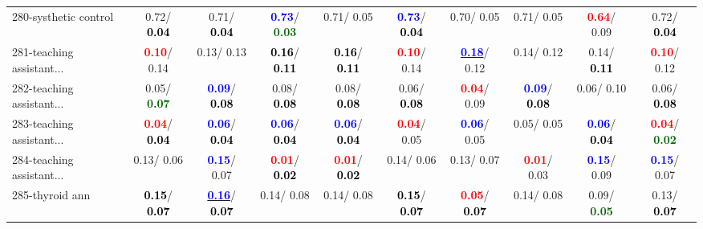 \begin{table}[h]
\begin{center}
{\begin{tabular}{lc|c|c|c|c|c|c|c|c}
280-systhetic control &   0.72/\textcolor{black}{\textbf{  0.04}} &   0.71/\textcolor{black}{\textbf{  0.04}} & \textcolor{blue}{\textbf{  0.73}}/\textcolor{darkgreen}{\textbf{  0.03}} &   0.71/  0.05 & \textcolor{blue}{\textbf{  0.73}}/\textcolor{black}{\textbf{  0.04}} &   0.70/  0.05 &   0.71/  0.05 & \textcolor{red}{\textbf{  0.64}}/  0.09 &   0.72/\textcolor{black}{\textbf{  0.04}} \\
281-teaching assistant... & \textcolor{red}{\textbf{  0.10}}/  0.14 &   0.13/  0.13 & \textcolor{black}{\textbf{  0.16}}/\textcolor{black}{\textbf{  0.11}} & \textcolor{black}{\textbf{  0.16}}/\textcolor{black}{\textbf{  0.11}} & \textcolor{red}{\textbf{  0.10}}/  0.14 & \underline{\textcolor{blue}{\textbf{  0.18}}}/  0.12 &   0.14/  0.12 &   0.14/\textcolor{black}{\textbf{  0.11}} & \textcolor{red}{\textbf{  0.10}}/  0.12 \\
282-teaching assistant... &   0.05/\textcolor{darkgreen}{\textbf{  0.07}} & \textcolor{blue}{\textbf{  0.09}}/\textcolor{black}{\textbf{  0.08}} &   0.08/\textcolor{black}{\textbf{  0.08}} &   0.08/\textcolor{black}{\textbf{  0.08}} &   0.06/\textcolor{black}{\textbf{  0.08}} & \textcolor{red}{\textbf{  0.04}}/  0.09 & \textcolor{blue}{\textbf{  0.09}}/\textcolor{black}{\textbf{  0.08}} &   0.06/  0.10 &   0.06/\textcolor{black}{\textbf{  0.08}} \\
283-teaching assistant... & \textcolor{red}{\textbf{  0.04}}/\textcolor{black}{\textbf{  0.04}} & \textcolor{blue}{\textbf{  0.06}}/\textcolor{black}{\textbf{  0.04}} & \textcolor{blue}{\textbf{  0.06}}/\textcolor{black}{\textbf{  0.04}} & \textcolor{blue}{\textbf{  0.06}}/\textcolor{black}{\textbf{  0.04}} & \textcolor{red}{\textbf{  0.04}}/  0.05 & \textcolor{blue}{\textbf{  0.06}}/  0.05 &   0.05/  0.05 & \textcolor{blue}{\textbf{  0.06}}/\textcolor{black}{\textbf{  0.04}} & \textcolor{red}{\textbf{  0.04}}/\textcolor{darkgreen}{\textbf{  0.02}} \\
284-teaching assistant... &   0.13/  0.06 & \textcolor{blue}{\textbf{  0.15}}/  0.07 & \textcolor{red}{\textbf{  0.01}}/\textcolor{black}{\textbf{  0.02}} & \textcolor{red}{\textbf{  0.01}}/\textcolor{black}{\textbf{  0.02}} &   0.14/  0.06 &   0.13/  0.07 & \textcolor{red}{\textbf{  0.01}}/  0.03 & \textcolor{blue}{\textbf{  0.15}}/  0.09 & \textcolor{blue}{\textbf{  0.15}}/  0.07 \\ \hline
285-thyroid ann & \textcolor{black}{\textbf{  0.15}}/\textcolor{black}{\textbf{  0.07}} & \underline{\textcolor{blue}{\textbf{  0.16}}}/\textcolor{black}{\textbf{  0.07}} &   0.14/  0.08 &   0.14/  0.08 & \textcolor{black}{\textbf{  0.15}}/\textcolor{black}{\textbf{  0.07}} & \textcolor{red}{\textbf{  0.05}}/\textcolor{black}{\textbf{  0.07}} &   0.14/  0.08 &   0.09/\textcolor{darkgreen}{\textbf{  0.05}} &   0.13/\textcolor{black}{\textbf{  0.07}} \\

\end{tabular}}
\end{center}
\end{table}
